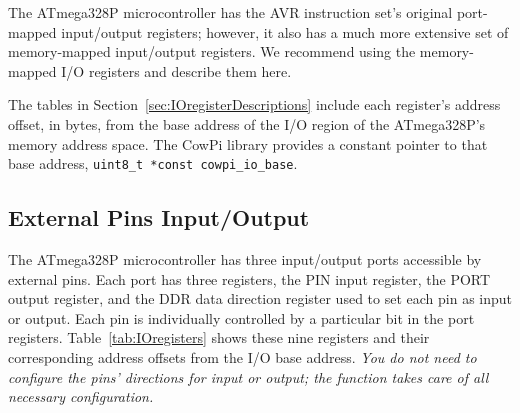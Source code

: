 The ATmega328P microcontroller has the AVR instruction set's original port-mapped input/output registers;
however, it also has a much more extensive set of memory-mapped input/output registers.
We recommend using the memory-mapped I/O registers and describe them here.

The tables in Section~\ref{sec:IOregisterDescriptions} include each register's address offset, in bytes, from the base address of the I/O region of the ATmega328P's memory address space.
The CowPi library provides a constant pointer to that base address, \lstinline{uint8_t *const cowpi_io_base}.

\subsection{External Pins Input/Output}

The ATmega328P microcontroller has three input/output ports accessible by external pins.
Each port has three registers, the PIN input register, the PORT output register, and the DDR data direction register used to set each pin as input or output.
Each pin is individually controlled by a particular bit in the port registers.
Table~\ref{tab:IOregisters} shows these nine registers and their corresponding address offsets from the I/O base address.
\textit{You do not need to configure the pins' directions for input or output;
the  function takes care of all necessary configuration.}


